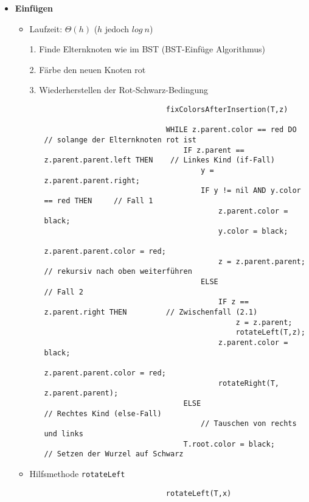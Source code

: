 \begin{itemize}
        \item \textbf{Einfügen}
            \begin{itemize}
                \item Laufzeit: $\Theta(h)$ ($h$ jedoch $log~n$)
                \item[1.] Finde Elternknoten wie im BST (BST-Einfüge Algorithmus)
                \item[2.] Färbe den neuen Knoten rot
                \item[3.] Wiederherstellen der Rot-Schwarz-Bedingung
                    \begin{itemize}
                        \item[]
                            \begin{verbatim}
                            fixColorsAfterInsertion(T,z)

                            WHILE z.parent.color == red DO                  // solange der Elternknoten rot ist
                                IF z.parent == z.parent.parent.left THEN    // Linkes Kind (if-Fall)
                                    y = z.parent.parent.right;
                                    IF y != nil AND y.color == red THEN     // Fall 1
                                        z.parent.color = black;
                                        y.color = black;
                                        z.parent.parent.color = red;
                                        z = z.parent.parent;                // rekursiv nach oben weiterführen
                                    ELSE                                    // Fall 2
                                        IF z == z.parent.right THEN         // Zwischenfall (2.1)
                                            z = z.parent;
                                            rotateLeft(T,z);
                                        z.parent.color = black;
                                        z.parent.parent.color = red;
                                        rotateRight(T, z.parent.parent);
                                ELSE                                        // Rechtes Kind (else-Fall)
                                    // Tauschen von rechts und links
                                T.root.color = black;                       // Setzen der Wurzel auf Schwarz
                            \end{verbatim}
                    \end{itemize}
\pagebreak
                \item Hilfsmethode \texttt{rotateLeft}
                    \begin{itemize}
                        \item[] 
                            \begin{verbatim}
                            rotateLeft(T,x)
                            

\end{verbatim}
\end{itemize}
\end{itemize}
\end{itemize}
